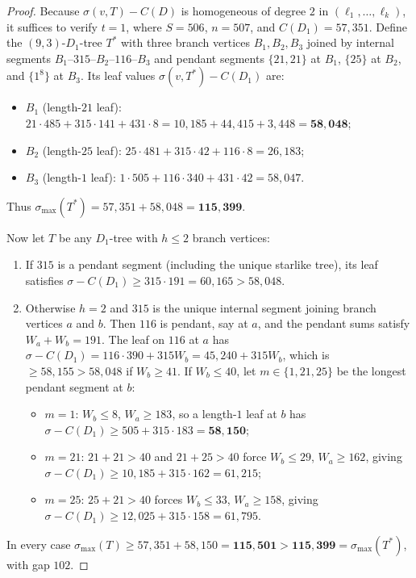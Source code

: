 \documentclass[11pt]{article}
\begin{document}
\begin{proof}
Because $\sigma(v, T) - C(D)$ is homogeneous of degree $2$ in $(\ell_1, \dots, \ell_k)$, it suffices to verify $t = 1$, where $S = 506$, $n = 507$, and $C(D_1) = 57{,}351$. Define the $(9,3)$-$D_1$-tree $T^*$ with three branch vertices $B_1, B_2, B_3$ joined by internal segments $B_1 \text{--}315\text{--} B_2 \text{--}116\text{--} B_3$ and pendant segments $\{21, 21\}$ at $B_1$, $\{25\}$ at $B_2$, and $\{1^8\}$ at $B_3$. Its leaf values $\sigma(v, T^*) - C(D_1)$ are:
\begin{itemize}
  \item $B_1$ (length-$21$ leaf): $21 \cdot 485 + 315 \cdot 141 + 431 \cdot 8 = 10{,}185 + 44{,}415 + 3{,}448 = \mathbf{58{,}048}$;
  \item $B_2$ (length-$25$ leaf): $25 \cdot 481 + 315 \cdot 42 + 116 \cdot 8 = 26{,}183$;
  \item $B_3$ (length-$1$ leaf): $1 \cdot 505 + 116 \cdot 340 + 431 \cdot 42 = 58{,}047$.
\end{itemize}
Thus $\sigma_{\max}(T^*) = 57{,}351 + 58{,}048 = \mathbf{115{,}399}$.

Now let $T$ be any $D_1$-tree with $h \le 2$ branch vertices:
\begin{enumerate}
  \item If $315$ is a pendant segment (including the unique starlike tree), its leaf satisfies $\sigma - C(D_1) \ge 315 \cdot 191 = 60{,}165 > 58{,}048$.
  \item Otherwise $h = 2$ and $315$ is the unique internal segment joining branch vertices $a$ and $b$. Then $116$ is pendant, say at $a$, and the pendant sums satisfy $W_a + W_b = 191$. The leaf on $116$ at $a$ has $\sigma - C(D_1) = 116 \cdot 390 + 315 W_b = 45{,}240 + 315 W_b$, which is $\ge 58{,}155 > 58{,}048$ if $W_b \ge 41$. If $W_b \le 40$, let $m \in \{1, 21, 25\}$ be the longest pendant segment at $b$:
  \begin{itemize}
    \item $m = 1$: $W_b \le 8$, $W_a \ge 183$, so a length-$1$ leaf at $b$ has $\sigma - C(D_1) \ge 505 + 315 \cdot 183 = \mathbf{58{,}150}$;
    \item $m = 21$: $21+21 > 40$ and $21+25 > 40$ force $W_b \le 29$, $W_a \ge 162$, giving $\sigma - C(D_1) \ge 10{,}185 + 315 \cdot 162 = 61{,}215$;
    \item $m = 25$: $25+21 > 40$ forces $W_b \le 33$, $W_a \ge 158$, giving $\sigma - C(D_1) \ge 12{,}025 + 315 \cdot 158 = 61{,}795$.
  \end{itemize}
\end{enumerate}
In every case $\sigma_{\max}(T) \ge 57{,}351 + 58{,}150 = \mathbf{115{,}501} > \mathbf{115{,}399} = \sigma_{\max}(T^*)$, with gap $102$.


\end{proof}
\end{document}
